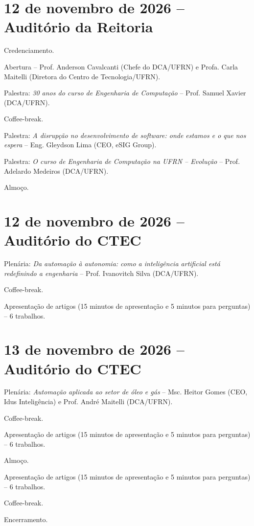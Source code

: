 \documentclass[12pt,a4paper,oneside,openany]{book}
\begin{document}
\section*{12 de novembro de 2026 -- Auditório da Reitoria}
\begin{description}[leftmargin=2.2cm,style=nextline]
  \item[08h00] Credenciamento.
  \item[09h00] Abertura -- Prof. Anderson Cavalcanti (Chefe do DCA/UFRN) e Profa. Carla Maitelli (Diretora do Centro de Tecnologia/UFRN).
  \item[09h30] Palestra: \textit{30 anos do curso de Engenharia de Computação} -- Prof. Samuel Xavier (DCA/UFRN).
  \item[10h20] Coffee-break.
  \item[10h50] Palestra: \textit{A disrupção no desenvolvimento de software: onde estamos e o que nos espera} -- Eng. Gleydson Lima (CEO, eSIG Group).
  \item[11h40] Palestra: \textit{O curso de Engenharia de Computação na UFRN -- Evolução} -- Prof. Adelardo Medeiros (DCA/UFRN).
  \item[12h30] Almoço.
\end{description}

\section*{12 de novembro de 2026 -- Auditório do CTEC}
\begin{description}[leftmargin=2.2cm,style=nextline]
  \item[14h00] Plenária: \textit{Da automação à autonomia: como a inteligência artificial está redefinindo a engenharia} -- Prof. Ivanovitch Silva (DCA/UFRN).
  \item[15h00] Coffee-break.
  \item[15h30] Apresentação de artigos (15 minutos de apresentação e 5 minutos para perguntas) -- 6 trabalhos.
\end{description}

\section*{13 de novembro de 2026 -- Auditório do CTEC}
\begin{description}[leftmargin=2.2cm,style=nextline]
  \item[09h00] Plenária: \textit{Automação aplicada ao setor de óleo e gás} -- Msc. Heitor Gomes (CEO, Idus Inteligência) e Prof. André Maitelli (DCA/UFRN).
  \item[10h00] Coffee-break.
  \item[10h30] Apresentação de artigos (15 minutos de apresentação e 5 minutos para perguntas) -- 6 trabalhos.
  \item[12h30] Almoço.
  \item[14h00] Apresentação de artigos (15 minutos de apresentação e 5 minutos para perguntas) -- 6 trabalhos.
  \item[16h00] Coffee-break.
  \item[16h30] Encerramento.
\end{description}
\end{document}
